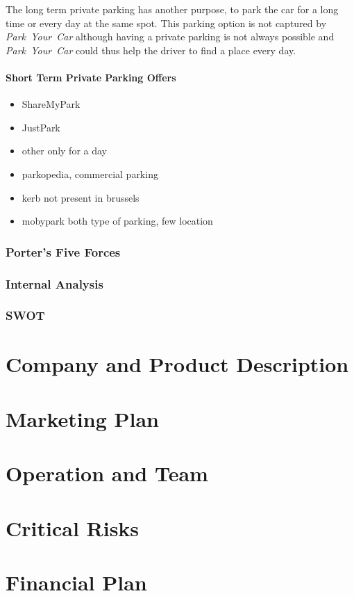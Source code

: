 \documentclass[12pt,a4paper,oneside]{book}
\newcommand{\bp}{\textit{Park~Your~Car }}
\begin{document}
The long term private parking has another purpose, to park the car for a long time or every day at the same spot. This parking option is not captured by \bp although having a private parking is not always possible and \bp could thus help the driver to find a place every day.

\subsubsection{Short Term Private Parking Offers}

\begin{itemize}
\item ShareMyPark
\item JustPark
\item other only for a day
\item parkopedia, commercial parking
\item kerb not present in brussels
\item mobypark both type of parking, few location
\end{itemize}

\subsection{Porter’s Five Forces}

\subsection{Internal Analysis}

\subsection{SWOT}

\chapter{Company and Product Description}

\chapter{Marketing Plan}

\chapter{Operation and Team}

\chapter{Critical Risks}

\chapter{Financial Plan}



%

\end{document}
